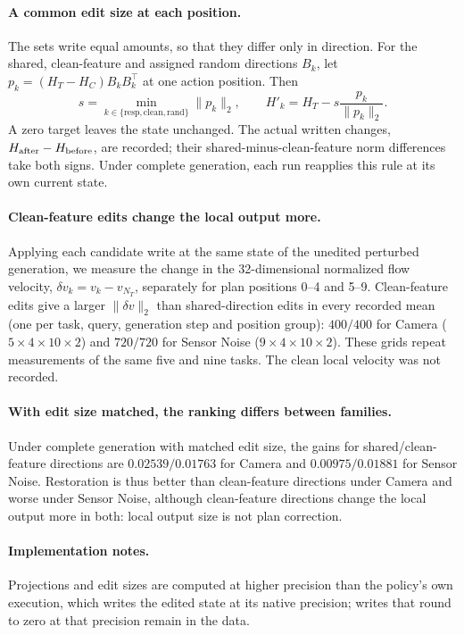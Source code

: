\paragraph{A common edit size at each position.}
The sets write equal amounts, so that they differ only in direction. For the shared, clean-feature and assigned random directions $B_k$, let $p_k=(H_T-H_C)B_kB_k^\top$ at one action position. Then
\begin{equation}
 s=\min_{k\in\{\mathrm{resp,clean,rand}\}}\|p_k\|_2,
 \qquad H'_k=H_T-s\frac{p_k}{\|p_k\|_2}.
 \label{eq:dev-common-target}
\end{equation}
A zero target leaves the state unchanged. The actual written changes, $H_{\rm after}-H_{\rm before}$, are recorded; their shared-minus-clean-feature norm differences take both signs. Under complete generation, each run reapplies this rule at its own current state.

\paragraph{Clean-feature edits change the local output more.}
Applying each candidate write at the same state of the unedited perturbed generation, we measure the change in the 32-dimensional normalized flow velocity, $\delta v_k=v_k-v_{N_T}$, separately for plan positions 0--4 and 5--9. Clean-feature edits give a larger $\|\delta v\|_2$ than shared-direction edits in every recorded mean (one per task, query, generation step and position group): $400/400$ for Camera ($5\times4\times10\times2$) and $720/720$ for Sensor Noise ($9\times4\times10\times2$). These grids repeat measurements of the same five and nine tasks. The clean local velocity was not recorded.

\paragraph{With edit size matched, the ranking differs between families.}
Under complete generation with matched edit size, the gains for shared/clean-feature directions are $0.02539/0.01763$ for Camera and $0.00975/0.01881$ for Sensor Noise. Restoration is thus better than clean-feature directions under Camera and worse under Sensor Noise, although clean-feature directions change the local output more in both: local output size is not plan correction.

\paragraph{Implementation notes.}
Projections and edit sizes are computed at higher precision than the policy's own execution, which writes the edited state at its native precision; writes that round to zero at that precision remain in the data.
